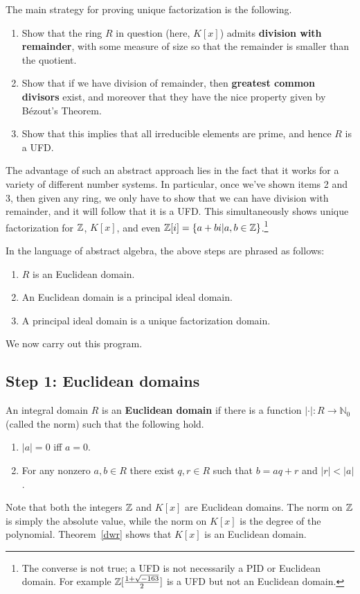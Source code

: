 The main strategy for proving unique factorization is the following.
\begin{enumerate}
\item Show that the ring $R$ in question (here, $K[x]$) admits \textbf{division with remainder}, with some measure of size so that the remainder is smaller than the quotient.
\item Show that if we have division of remainder, then \textbf{greatest common divisors} exist, and moreover that they have the nice property given by B\'ezout's Theorem.
\item Show that this implies that all irreducible elements are prime, and hence $R$ is a UFD.
\end{enumerate}
The advantage of such an abstract approach lies in the fact that it works for a variety of different number systems. In particular, once we've shown items 2 and 3, then given any ring, we only have to show that we can have division with remainder, and it will follow that it is a UFD. This simultaneously shows unique factorization for $\mathbb{Z}$, $K[x]$, and even $\mathbb{Z}[i]=\{a+bi|a,b\in \mathbb{Z}\}$.\footnote{The converse is not true; a UFD is not necessarily a PID or Euclidean domain. For example $\mathbb{Z}[\frac{1+\sqrt{-163}}{2}]$ is a UFD but not an Euclidean domain.}

In the language of abstract algebra, the above steps are phrased as follows:
\begin{enumerate}
\item $R$ is an Euclidean domain.
\item An Euclidean domain is a principal ideal domain.
\item A principal ideal domain is a unique factorization domain.
\end{enumerate}
We now carry out this program.

\subsection{Step 1: Euclidean domains}
\begin{df}
An integral domain $R$ is an \textbf{Euclidean domain} if there is a function $|\cdot |:R\to \mathbb N_0$ (called the norm) such that the following hold.
\begin{enumerate}
\item $|a|=0$ iff $a=0$.
\item For any nonzero $a,b\in R$ there exist $q,r\in R$ such that $b=aq+r$ and $|r|<|a|$.
\end{enumerate}
\end{df}
Note that both the integers $\mathbb{Z}$ and $K[x]$ are Euclidean domains. The norm on $\mathbb{Z}$ is simply the absolute value, while the norm on $K[x]$ is the degree of the polynomial. Theorem~\ref{dwr} shows that $K[x]$ is an Euclidean domain.

